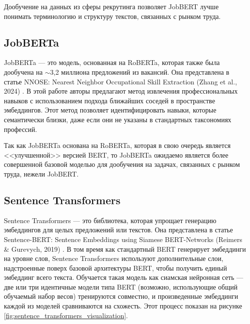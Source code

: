 \documentclass[14pt]{mmcs_article}
\begin{document}
Дообучение на данных из сферы рекрутинга позволяет JobBERT лучше понимать терминологию и структуру текстов, связанных с рынком труда. \cite{yacenko2023}

\subsection*{JobBERTa}\label{jobberta}

JobBERTa --- это модель, основанная на RoBERTa, которая также была дообучена на $\sim$3,2 миллиона предложений из вакансий. Она представлена в статье NNOSE: Nearest Neighbor Occupational Skill Extraction (Zhang et al., 2024) \cite{zhang-etal-2024-nnose}. В этой работе авторы предлагают метод извлечения профессиональных навыков с использованием подхода ближайших соседей в пространстве эмбеддингов. Этот метод позволяет идентифицировать навыки, которые семантически близки, даже если они не указаны в стандартных таксономиях профессий.

Так как JobBERTa основана на RoBERTa, которая в свою очередь является <<улучшенной>> версией BERT, то JobBERTa ожидаемо является более совершенной базовой моделью для дообучения на задачах, связанных с рынком труда, нежели JobBERT.

\subsection*{Sentence Transformers}\label{sentence_transformers}

Sentence Transformers — это библиотека, которая упрощает генерацию эмбеддингов для целых предложений или текстов. Она представлена в статье Sentence-BERT: Sentence Embeddings using Siamese BERT-Networks (Reimers \& Gurevych, 2019) \cite{reimers2019sentencebertsentenceembeddingsusing}. В том время как стандартный BERT генерирует эмбеддинги на уровне слов, Sentence Transformers используют дополнительные слои, надстроенные поверх базовой архитектуры BERT, чтобы получить единый эмбеддинг всего текста. Обучается такая модель как сиамская нейронная сеть --- две или три идентичные модели типа BERT (возможно, использующие общий обучаемый набор весов) тренируются совместно, и произведенные эмбеддинги каждой из моделей сравниваются на схожесть. Этот процесс показан на рисунке \ref{fig:sentence_transformers_visualization}.
\end{document}
